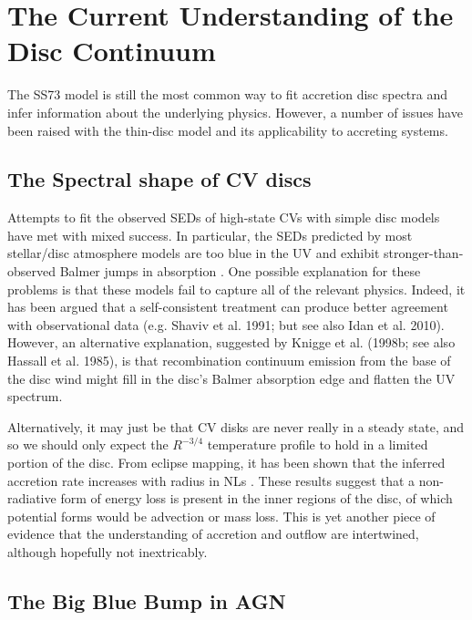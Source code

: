 \section{The Current Understanding of the Disc Continuum}

\label{sec:disc_continuum}

The SS73 model is still the most common way to fit accretion disc spectra and infer
information about the underlying physics. However, 
a number of issues have been raised with the thin-disc model and
its applicability to accreting systems. 

\subsection{The Spectral shape of CV discs}

Attempts to fit the observed SEDs of high-state CVs with simple disc models 
have met with mixed success. In
particular, the SEDs predicted by most stellar/disc atmosphere models 
are too blue in the UV \citep{wade1988,long1991,long1994,knigge1998} and exhibit
stronger-than-observed Balmer jumps in absorption 
\citep{wade1984,haug1987,ladous1989b,knigge1998}. One possible
explanation for these problems is that these models fail to capture
all of the relevant physics. Indeed, it has been argued that a
self-consistent treatment can produce better agreement with 
observational data (e.g. Shaviv et al. 1991;  but see also Idan et al. 2010).
\nocite{idanshaviv2010} \nocite{shaviv1991}
However, an alternative explanation, suggested by Knigge et al.
(1998b; see also Hassall et al. 1985)\nocite{KLWB98,hassall}, 
is that recombination continuum emission from the base of the 
disc wind might fill in the disc's Balmer absorption edge and flatten 
the UV spectrum.

Alternatively, it may just be that CV disks are never really in
a steady state, and so we should only expect the $R^{-3/4}$
temperature profile to hold in a limited portion of the disc.
From eclipse mapping, it has been shown that the inferred accretion
rate increases with radius in NLs \citep{rutten1992, horne1993}.
These results suggest that a non-radiative form of energy loss
is present in the inner regions of the disc, of which potential forms
would be advection or mass loss. This is yet another piece of evidence
that the understanding of accretion and outflow 
are intertwined, although hopefully not inextricably.

\subsection{The Big Blue Bump in AGN}

